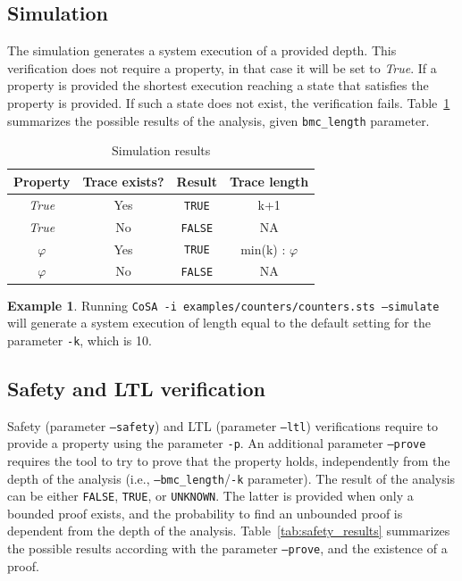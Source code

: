 \documentclass{article}
\theoremstyle{definition}
\newtheorem{example}{Example}[section]
\begin{document}
\subsection{Simulation}
The simulation generates a system execution of a provided depth. This
verification does not require a property, in that case it will be set
to \emph{True}. If a property is provided the shortest execution
reaching a state that satisfies the property is provided. If such a
state does not exist, the verification
fails. Table~\ref{tab:simulation_results} summarizes the possible
results of the analysis, given \texttt{bmc\_length} parameter.

\begin{table}[h]
  \centering
\begin{tabular}{ c c | c c }
  Property & Trace exists? & Result & Trace length \\ \hline 
  \emph{True} & Yes & \texttt{TRUE} & k+1  \\
  \emph{True} & No & \texttt{FALSE} & NA  \\
  $\varphi$ & Yes & \texttt{TRUE} & min(k) : $\varphi$  \\
  $\varphi$ & No & \texttt{FALSE} & NA  \\
\end{tabular}
\caption{Simulation results}
\label{tab:simulation_results}
\end{table}

\begin{example}
  Running \texttt{CoSA -i examples/counters/counters.sts --simulate}
  will generate a system execution of length equal to the default
  setting for the parameter \texttt{-k}, which is 10.
\end{example}

\subsection{Safety and LTL verification}

Safety (parameter \texttt{--safety}) and LTL (parameter
\texttt{--ltl}) verifications require to provide a property using the
parameter \texttt{-p}. An additional parameter \texttt{--prove}
requires the tool to try to prove that the property holds,
independently from the depth of the analysis (i.e.,
\texttt{--bmc\_length}/\texttt{-k} parameter). The result of the
analysis can be either \texttt{FALSE}, \texttt{TRUE}, or
\texttt{UNKNOWN}. The latter is provided when only a bounded proof
exists, and the probability to find an unbounded proof is dependent
from the depth of the analysis. Table~\ref{tab:safety_results}
summarizes the possible results according with the parameter
\texttt{--prove}, and the existence of a proof.
\end{document}
